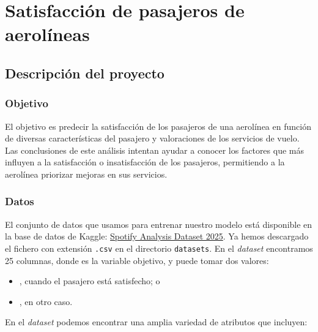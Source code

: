 \section{Satisfacción de pasajeros de aerolíneas}

\subsection{Descripción del proyecto}

\subsubsection{Objetivo}

El objetivo es predecir la satisfacción de los pasajeros de una aerolínea en función de diversas características del pasajero y valoraciones de los servicios de vuelo. Las conclusiones de este análisis intentan ayudar a conocer los factores que más influyen a la satisfacción o insatisfacción de los pasajeros, permitiendo a la aerolínea priorizar mejoras en sus servicios.


\subsubsection{Datos}

El conjunto de datos que usamos para entrenar nuestro modelo está disponible en la base de datos de Kaggle: 
\href{https://www.kaggle.com/datasets/nabihazahid/spotify-dataset-for-churn-analysis/data}{Spotify Analysis Dataset 2025}. Ya hemos descargado el fichero con extensión \texttt{.csv} en el directorio \texttt{datasets}.
En el \textit{dataset} encontramos 25 columnas, donde  es la variable objetivo, y puede tomar dos valores:
\begin{itemize}
    \item {}, cuando el pasajero está satisfecho; o
    \item {}, en otro caso.
\end{itemize}

En el \textit{dataset} podemos encontrar una amplia variedad de atributos que incluyen:

